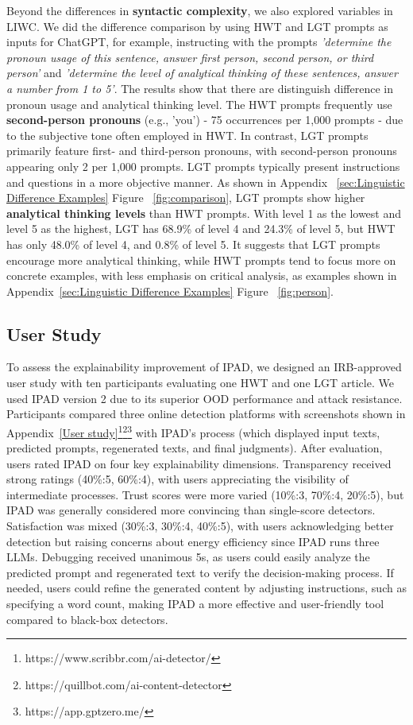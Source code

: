 Beyond the differences in \textbf{syntactic complexity}, we also explored variables in LIWC. We did the difference comparison by using HWT and LGT prompts as inputs for ChatGPT, for example, instructing with the prompts \textit{'determine the pronoun usage of this sentence, answer first person, second person, or third person'} and \textit{'determine the level of analytical thinking of these sentences, answer a number from 1 to 5'}. The results show that there are distinguish difference in pronoun usage and analytical thinking level. The HWT prompts frequently use \textbf{second-person pronouns} (e.g., 'you') - 75 occurrences per 1,000 prompts - due to the subjective tone often employed in HWT. In contrast, LGT prompts primarily feature first- and third-person pronouns, with second-person pronouns appearing only 2 per 1,000 prompts. LGT prompts typically present instructions and questions in a more objective manner. As shown in Appendix ~\ref{sec:Linguistic Difference Examples} Figure ~\ref{fig:comparison}, LGT prompts show higher \textbf{analytical thinking levels} than HWT prompts. With level 1 as the lowest and level 5 as the highest, LGT has 68.9\% of level 4 and 24.3\% of level 5, but HWT has only 48.0\% of level 4, and 0.8\% of level 5. It suggests that LGT prompts encourage more analytical thinking, while HWT prompts tend to focus more on concrete examples, with less emphasis on critical analysis, as examples shown in Appendix~\ref{sec:Linguistic Difference Examples} Figure ~\ref{fig:person}.


\subsection{User Study}
To assess the explainability improvement of IPAD, we designed an IRB-approved user study with ten participants evaluating one HWT and one LGT article. We used IPAD version 2 due to its superior OOD performance and attack resistance. Participants compared three online detection platforms with screenshots shown in Appendix~\ref{User study}\footnote{https://www.scribbr.com/ai-detector/}\footnote{https://quillbot.com/ai-content-detector}\footnote{https://app.gptzero.me/} with IPAD's process (which displayed input texts, predicted prompts, regenerated texts, and final judgments). After evaluation, users rated IPAD on four key explainability dimensions. Transparency received strong ratings (40\%:5, 60\%:4), with users appreciating the visibility of intermediate processes. Trust scores were more varied (10\%:3, 70\%:4, 20\%:5), but IPAD was generally considered more convincing than single-score detectors. Satisfaction was mixed (30\%:3, 30\%:4, 40\%:5), with users acknowledging better detection but raising concerns about energy efficiency since IPAD runs three LLMs. Debugging received unanimous 5s, as users could easily analyze the predicted prompt and regenerated text to verify the decision-making process. If needed, users could refine the generated content by adjusting instructions, such as specifying a word count, making IPAD a more effective and user-friendly tool compared to black-box detectors.


%